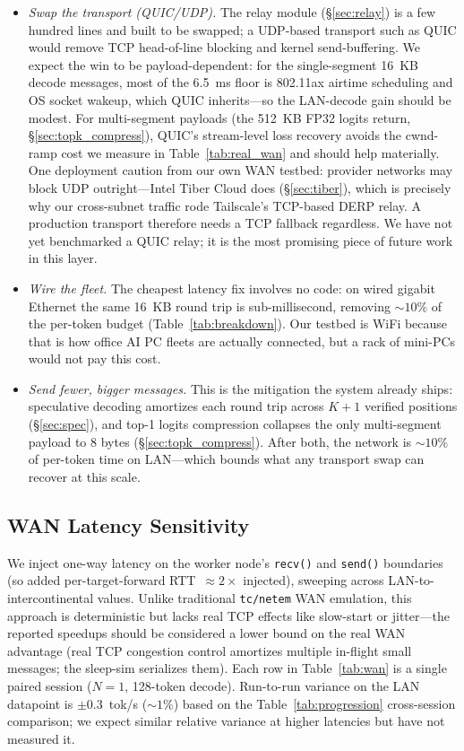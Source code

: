 \documentclass[11pt]{article}
\begin{document}
\begin{itemize}[leftmargin=*]
  \item \emph{Swap the transport (QUIC/UDP).} The relay module (\S\ref{sec:relay}) is a few hundred lines and built to be swapped; a UDP-based transport such as QUIC would remove TCP head-of-line blocking and kernel send-buffering. We expect the win to be payload-dependent: for the single-segment 16~KB decode messages, most of the 6.5~ms floor is 802.11ax airtime scheduling and OS socket wakeup, which QUIC inherits---so the LAN-decode gain should be modest. For multi-segment payloads (the 512~KB FP32 logits return, \S\ref{sec:topk_compress}), QUIC's stream-level loss recovery avoids the cwnd-ramp cost we measure in Table~\ref{tab:real_wan} and should help materially. One deployment caution from our own WAN testbed: provider networks may block UDP outright---Intel Tiber Cloud does (\S\ref{sec:tiber}), which is precisely why our cross-subnet traffic rode Tailscale's TCP-based DERP relay. A production transport therefore needs a TCP fallback regardless. We have not yet benchmarked a QUIC relay; it is the most promising piece of future work in this layer.
  \item \emph{Wire the fleet.} The cheapest latency fix involves no code: on wired gigabit Ethernet the same 16~KB round trip is sub-millisecond, removing ${\sim}10\%$ of the per-token budget (Table~\ref{tab:breakdown}). Our testbed is WiFi because that is how office AI PC fleets are actually connected, but a rack of mini-PCs would not pay this cost.
  \item \emph{Send fewer, bigger messages.} This is the mitigation the system already ships: speculative decoding amortizes each round trip across $K\!+\!1$ verified positions (\S\ref{sec:spec}), and top-1 logits compression collapses the only multi-segment payload to 8 bytes (\S\ref{sec:topk_compress}). After both, the network is ${\sim}10\%$ of per-token time on LAN---which bounds what any transport swap can recover at this scale.
\end{itemize}

\subsection{WAN Latency Sensitivity}
\label{sec:wan}

We inject one-way latency on the worker node's \texttt{recv()} and \texttt{send()} boundaries (so added per-target-forward RTT~$\approx 2 \times$ injected), sweeping across LAN-to-intercontinental values. Unlike traditional \texttt{tc/netem} WAN emulation, this approach is deterministic but lacks real TCP effects like slow-start or jitter---the reported speedups should be considered a lower bound on the real WAN advantage (real TCP congestion control amortizes multiple in-flight small messages; the sleep-sim serializes them). Each row in Table~\ref{tab:wan} is a single paired session ($N\!=\!1$, 128-token decode). Run-to-run variance on the LAN datapoint is $\pm 0.3$~tok/s ($\sim 1\%$) based on the Table~\ref{tab:progression} cross-session comparison; we expect similar relative variance at higher latencies but have not measured it.
\end{document}
